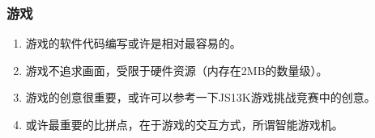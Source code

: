 \documentclass[compress,aspectratio=169]{ctexbeamer}
\begin{document}
\begin{frame}
    \frametitle{游戏}
    \begin{enumerate}
        \item 游戏的软件代码编写或许是相对最容易的。
        \item 游戏不追求画面，受限于硬件资源（内存在2MB的数量级）。
        \item 游戏的创意很重要，或许可以参考一下JS13K游戏挑战竞赛中的创意。
        \item 或许最重要的比拼点，在于游戏的交互方式，所谓智能游戏机。
    \end{enumerate}
\end{frame}
\end{document}
